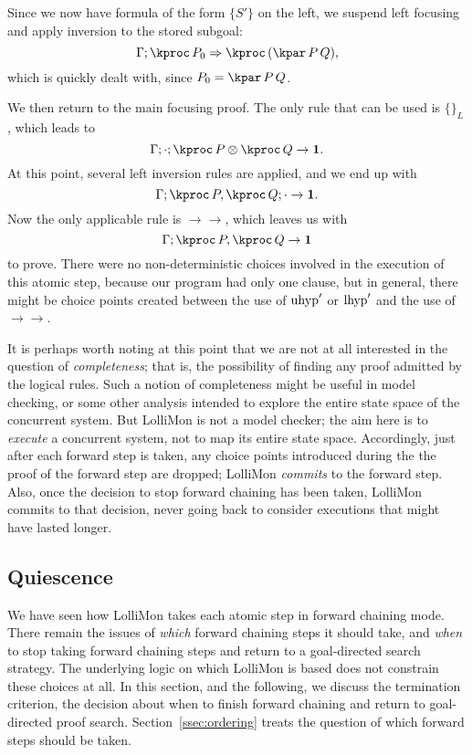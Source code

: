 \documentclass{sig-alt}
\begin{document}
Since we now have formula of the form $\{S'\}$ on the left, we suspend
left focusing and apply inversion
to the stored subgoal:
$$
  \CLFRIseq{\Gamma}{\kproc\,P_0}{\kproc\,(\kpar\,P\,Q)},
$$
%
which is quickly dealt with, since $P_0=\kpar\,P\,Q$.  

We then return to the main focusing proof.  The only rule that can be
used is $\{\}_L$, which leads to
$$
  \CLFLIseq{\Gamma}{\cdot}{\kproc\,P\tensor\kproc\,Q}{\one}.
$$
At this point, several left inversion rules
are applied, and we end up with
$$
  \CLFLIseq{\Gamma}{\kproc\,P, \kproc\,Q}{\cdot}{\one}.
$$
%
Now the only applicable rule is $\rightarrow\rightarrow$, which leaves us with
$$
  \CLFLseq{\Gamma}{\kproc\,P, \kproc\,Q}{\one}
$$
%
to prove.  There were no non-deterministic choices involved in the
execution of this atomic step, because our program had only one
clause, but in general, there might be choice points created between
the use of $\hbox{uhyp}'$ or $\hbox{lhyp}'$ and the use of
$\rightarrow\rightarrow$.

It is perhaps worth noting at this point that we are not at all
interested in the question of \emph{completeness}; that is, the
possibility of finding any proof admitted by the logical rules.  Such
a notion of completeness might be useful in model checking, or some
other analysis intended to explore the entire state space of the
concurrent system.  But LolliMon is not a model checker; the aim here
is to \emph{execute} a concurrent system, not to map its entire state
space.  Accordingly, just after each forward step is taken, any choice
points introduced during the the proof of the forward step are
dropped; LolliMon \emph{commits} to the forward step. Also, once the
decision to stop forward chaining has been taken, LolliMon commits to
that decision, never going back to consider executions that might have
lasted longer.

\subsection{Quiescence}
\label{ssec:quiescence}
We have seen how LolliMon takes each atomic step in forward chaining
mode.  There remain the issues of \emph{which} forward chaining steps
it should take, and \emph{when} to stop taking forward chaining steps
and return to a goal-directed search strategy.
The underlying logic on which LolliMon is based does not constrain
these choices at all.
In this section, and the following, we discuss the termination criterion,
the decision about when to finish forward chaining and return to goal-directed
proof search.  Section~\ref{ssec:ordering} treats the question of which
forward steps should be taken.
\end{document}
